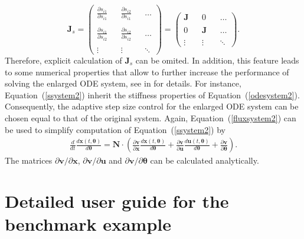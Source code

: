 \documentclass[12pt,a4paper]{scrartcl}
\newcommand{\dd}[2]{\frac{\partial #1}{\partial #2}}
\newcommand{\DD}[2]{\frac{d #1}{d #2}}
\begin{document}
\begin{displaymath}
\mathbf{J}_s = \left( 
\begin{array}{ccccc}
\dd{s_{i1}}{s_{i1}} & & \dd{s_{i2}}{s_{i1}} & & \ldots \\
\\
\dd{s_{i1}}{s_{i2}} & & \dd{s_{i2}}{s_{i2}}& & \ldots \\
\\
\vdots & & \vdots & & \ddots
\end{array} 
\right) = \left( 
\begin{array}{ccccc}
\mathbf{J} & & 0 & & \ldots \\
\\
0 & & \mathbf{J}& & \ldots \\
\\
\vdots & & \vdots & & \ddots
\end{array} 
\right).
\end{displaymath}
Therefore, explicit calculation of $\mathbf{J}_s$ can be omited. In addition, this feature 
leads to some numerical properties that allow to further increase the performance of 
solving the enlarged ODE system, see in \cite{Hindmarsh:2005fb} for details. For instance, 
Equation~(\ref{ssystem2}) inherit the stiffness properties of Equation~(\ref{odesystem2}). 
Consequently, the adaptive step size control for the enlarged ODE system can be chosen 
equal to that of the original system. Again, Equation~(\ref{fluxsystem2}) can be used to 
simplify computation of Equation~(\ref{ssystem2}) by 
\begin{eqnarray}
	\DD{}{t} \DD{\mathbf{x}(t,\boldsymbol{\theta})}{\boldsymbol{\theta}}  =  \mathbf{N}
\cdot \left(  \dd{\mathbf{v}}{\mathbf{x}}  \DD{\mathbf{x}(t,\boldsymbol{\theta})}
{\boldsymbol{\theta}} +  \dd{\mathbf{v}}{\mathbf{u}}  \DD{\mathbf{u}(t,\boldsymbol{\theta})}
{\boldsymbol{\theta}} + \dd{\mathbf{v}}{\boldsymbol{\theta}} \right). \label{ssystemflux}
\end{eqnarray}
The matrices $\partial{\mathbf{v}}/\partial{\mathbf{x}}$, $\partial{\mathbf{v}}/
\partial{\mathbf{u}}$ and $\partial{\mathbf{v}}/\partial{\boldsymbol{\theta}}$ can be 
calculated analytically.

\section{Detailed user guide for the \citet{Raia:2011vn} benchmark example} 
\label{user_guide}

\renewcommand{\bibname}{References}
\renewcommand{\bibfont}{\small}


\end{document}
